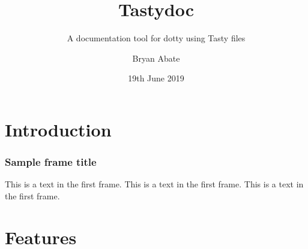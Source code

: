 \documentclass{beamer}
\title{Tastydoc}
\subtitle{A documentation tool for dotty using Tasty files}
\author{Bryan Abate}
\date{19th June 2019}
\begin{document}
 
\frame{\titlepage}


\section{Introduction}

\begin{frame}
\frametitle{Sample frame title}
This is a text in the first frame. This is a text in the first frame. This is a text in the first frame.
\end{frame}
 
\section{Features}
\end{document}
